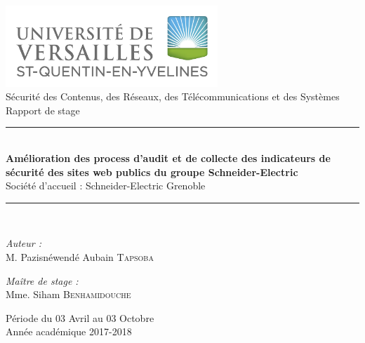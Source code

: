 \documentclass[a4paper,12pt]{book}
\theoremstyle{break}
\begin{document}

\begin{titlepage}
\begin{center}

\includegraphics[width=0.6\textwidth]{uvsq-logo-rvb-def}\\[1cm]

{\large Sécurité des Contenus, des Réseaux, des Télécommunications et des Systèmes}\\[0.5cm]

{\large Rapport de stage}\\[0.5cm]

\rule{\linewidth}{0.5mm} \\[0.4cm]
{ \huge \bfseries Amélioration des process d'audit et de collecte des indicateurs de sécurité des sites web publics du groupe Schneider-Electric\\[0.4cm] }
Société d'accueil : Schneider-Electric Grenoble
\rule{\linewidth}{0.5mm} \\[1.5cm]


\noindent
\begin{minipage}{0.4\textwidth}
  \begin{flushleft} \large
    \emph{Auteur :}\\
    M. Pazisnéwendé Aubain  \textsc{Tapsoba}\\

  \end{flushleft}
\end{minipage}%
\begin{minipage}{0.4\textwidth}
  \begin{flushright} \large
    \emph{Maître de stage :} \\
    Mme. Siham \textsc{Benhamidouche}\\
  
  \end{flushright}
\end{minipage}

\vfill

{\large Période du 03 Avril au 03 Octobre \\ Année académique 2017-2018}

\end{center}
\end{titlepage}
\end{document}
